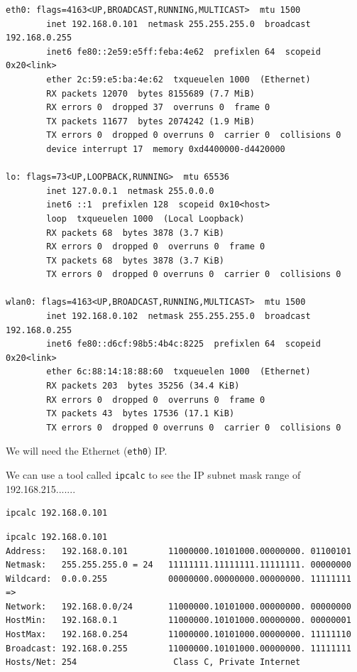 \documentclass[a4paper,12pt]{article}
\begin{document}
\begin{verbatim}
eth0: flags=4163<UP,BROADCAST,RUNNING,MULTICAST>  mtu 1500
        inet 192.168.0.101  netmask 255.255.255.0  broadcast 192.168.0.255
        inet6 fe80::2e59:e5ff:feba:4e62  prefixlen 64  scopeid 0x20<link>
        ether 2c:59:e5:ba:4e:62  txqueuelen 1000  (Ethernet)
        RX packets 12070  bytes 8155689 (7.7 MiB)
        RX errors 0  dropped 37  overruns 0  frame 0
        TX packets 11677  bytes 2074242 (1.9 MiB)
        TX errors 0  dropped 0 overruns 0  carrier 0  collisions 0
        device interrupt 17  memory 0xd4400000-d4420000  

lo: flags=73<UP,LOOPBACK,RUNNING>  mtu 65536
        inet 127.0.0.1  netmask 255.0.0.0
        inet6 ::1  prefixlen 128  scopeid 0x10<host>
        loop  txqueuelen 1000  (Local Loopback)
        RX packets 68  bytes 3878 (3.7 KiB)
        RX errors 0  dropped 0  overruns 0  frame 0
        TX packets 68  bytes 3878 (3.7 KiB)
        TX errors 0  dropped 0 overruns 0  carrier 0  collisions 0

wlan0: flags=4163<UP,BROADCAST,RUNNING,MULTICAST>  mtu 1500
        inet 192.168.0.102  netmask 255.255.255.0  broadcast 192.168.0.255
        inet6 fe80::d6cf:98b5:4b4c:8225  prefixlen 64  scopeid 0x20<link>
        ether 6c:88:14:18:88:60  txqueuelen 1000  (Ethernet)
        RX packets 203  bytes 35256 (34.4 KiB)
        RX errors 0  dropped 0  overruns 0  frame 0
        TX packets 43  bytes 17536 (17.1 KiB)
        TX errors 0  dropped 0 overruns 0  carrier 0  collisions 0

\end{verbatim}

We will need the Ethernet (\texttt{eth0}) IP.

We can use a tool called \texttt{ipcalc} to see the IP subnet mask range of 192.168.215.......

\begin{verbatim}
ipcalc 192.168.0.101
\end{verbatim}

\begin{verbatim}
ipcalc 192.168.0.101
Address:   192.168.0.101        11000000.10101000.00000000. 01100101
Netmask:   255.255.255.0 = 24   11111111.11111111.11111111. 00000000
Wildcard:  0.0.0.255            00000000.00000000.00000000. 11111111
=>
Network:   192.168.0.0/24       11000000.10101000.00000000. 00000000
HostMin:   192.168.0.1          11000000.10101000.00000000. 00000001
HostMax:   192.168.0.254        11000000.10101000.00000000. 11111110
Broadcast: 192.168.0.255        11000000.10101000.00000000. 11111111
Hosts/Net: 254                   Class C, Private Internet

\end{verbatim}
\end{document}
